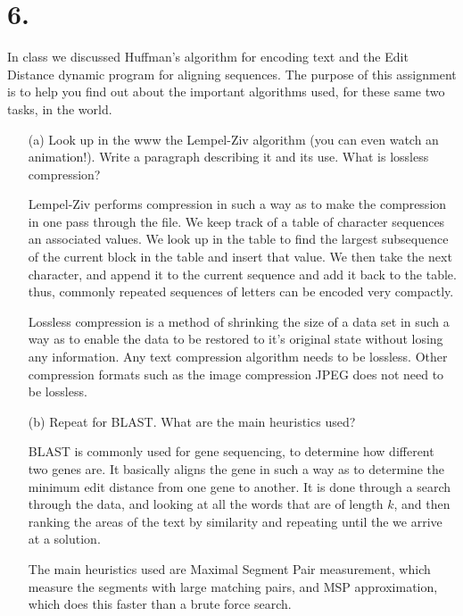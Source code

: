 \documentclass[11pt]{article}
\begin{document}
\section*{6.}
In class we discussed Huffman's algorithm for encoding text and the Edit
Distance dynamic program for aligning sequences. The purpose of this assignment
is to help you find out about the important algorithms used, for these same two
tasks, in the world.
\begin{enumerate}
\item[(a)] Look up in the www the Lempel-Ziv algorithm (you can even watch an
animation!). Write a paragraph describing it and its use. What is lossless
compression?

Lempel-Ziv performs compression in such a way as to make the compression in one
pass through the file. We keep track of a table of character sequences an
associated values. We look up in the table to find the largest subsequence of
the current block in the table and insert that value. We then take the next
character, and append it to the current sequence and add it back to the table.
thus, commonly repeated sequences of letters can be encoded very compactly. 

Lossless compression is a method of shrinking the size of a data set in such a
way as to enable the data to be restored to it's original state without losing
any information. Any text compression algorithm needs to be lossless. Other
compression formats such as the image compression JPEG does not need to be
lossless.

\item[(b)] Repeat for BLAST. What are the main heuristics used?

BLAST is commonly used for gene sequencing, to determine how different two genes
are. It basically aligns the gene in such a way as to determine the minimum edit
distance from one gene to another. It is done through a search through the data,
and looking at all the words that are of length $k$, and then ranking the areas
of the text by similarity and repeating until the we arrive at a solution. 

The main heuristics used are Maximal Segment Pair measurement, which measure the
segments with large matching pairs, and MSP approximation, which does this
faster than a brute force search.
\end{enumerate}
\end{document}
